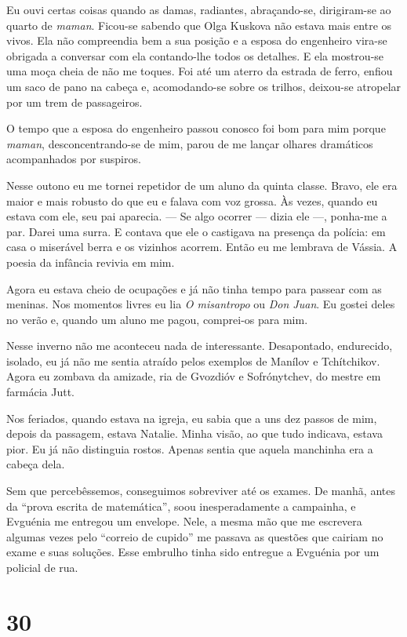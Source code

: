 Eu ouvi certas coisas quando as damas, radiantes, abraçando-se,
dirigiram-se ao quarto de \emph{maman}. Ficou-se sabendo que Olga
Kuskova não estava mais entre os vivos. Ela não compreendia bem a sua
posição e a esposa do engenheiro vira-se obrigada a conversar com ela
contando-lhe todos os detalhes. E ela mostrou-se uma moça cheia de não
me toques. Foi até um aterro da estrada de ferro, enfiou um saco de pano
na cabeça e, acomodando-se sobre os trilhos, deixou-se atropelar por um
trem de passageiros.

O tempo que a esposa do engenheiro passou conosco foi bom para mim
porque \emph{maman}, desconcentrando-se de mim, parou de me lançar
olhares dramáticos acompanhados por suspiros.

Nesse outono eu me tornei repetidor de um aluno da quinta classe. Bravo,
ele era maior e mais robusto do que eu e falava com voz grossa. Às
vezes, quando eu estava com ele, seu pai aparecia. --- Se algo ocorrer
--- dizia ele ---, ponha-me a par. Darei uma surra. E contava que ele o
castigava na presença da polícia: em casa o miserável berra e os
vizinhos acorrem. Então eu me lembrava de Vássia. A poesia da infância
revivia em mim.

Agora eu estava cheio de ocupações e já não tinha tempo para passear com
as meninas. Nos momentos livres eu lia \emph{O misantropo} ou \emph{Don
Juan}. Eu gostei deles no verão e, quando um aluno me pagou, comprei-os
para mim.

Nesse inverno não me aconteceu nada de interessante. Desapontado,
endurecido, isolado, eu já não me sentia atraído pelos exemplos de
Manílov e Tchítchikov. Agora eu zombava da amizade, ria de Gvozdióv e
Sofrónytchev, do mestre em farmácia Jutt.

Nos feriados, quando estava na igreja, eu sabia que a uns dez passos de
mim, depois da passagem, estava Natalie. Minha visão, ao que tudo
indicava, estava pior. Eu já não distinguia rostos. Apenas sentia que
aquela manchinha era a cabeça dela.

Sem que percebêssemos, conseguimos sobreviver até os exames. De manhã,
antes da ``prova escrita de matemática'', soou inesperadamente a
campainha, e Evguénia me entregou um envelope. Nele, a mesma mão que me
escrevera algumas vezes pelo ``correio de cupido'' me passava as
questões que cairiam no exame e suas soluções. Esse embrulho tinha sido
entregue a Evguénia por um policial de rua.

\section{30}

